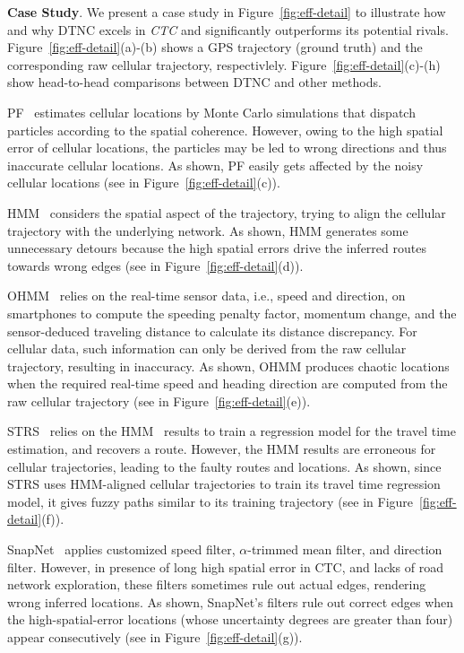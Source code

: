 \documentclass{vldb}
\begin{document}
	
	\textbf{Case Study}.
	We present a case study in Figure~\ref{fig:eff-detail} to illustrate how and why DTNC excels in \textit{CTC} and significantly outperforms its potential rivals.
	Figure~\ref{fig:eff-detail}(a)-(b) shows a GPS trajectory (ground truth) and the corresponding raw cellular trajectory, respectivlely. Figure~\ref{fig:eff-detail}(c)-(h) show head-to-head comparisons between DTNC and other methods. 
	
	PF~\cite{kempinska2016probabilistic} estimates cellular locations by Monte Carlo simulations that dispatch particles according to the spatial coherence. However, owing to the high spatial error of cellular locations, the particles may be led to wrong directions and thus inaccurate cellular locations. As shown,  PF easily gets affected by the noisy cellular locations (see in Figure~\ref{fig:eff-detail}(c)). 
	
	HMM~\cite{newson2009hidden} considers the spatial aspect of the trajectory, trying to align the cellular trajectory with the underlying network.
	As shown, HMM generates some unnecessary detours because the high spatial errors drive the inferred routes towards wrong edges (see in Figure~\ref{fig:eff-detail}(d)).
	
	OHMM~\cite{goh2012online} relies on the real-time sensor data, i.e., speed and direction, on smartphones to compute the speeding penalty factor, momentum change, and the sensor-deduced traveling distance to calculate its distance discrepancy. For cellular data, such information can only be derived from the raw cellular trajectory, resulting in inaccuracy. As shown, OHMM produces chaotic locations when the required real-time speed and heading direction are computed from the raw cellular trajectory (see in Figure~\ref{fig:eff-detail}(e)).
	
	STRS~\cite{DBLP:conf/kdd/WuMSZZCW16} relies on the HMM~\cite{newson2009hidden} results to train a regression model for the travel time estimation, and recovers a route. 
	However, the HMM results are erroneous for cellular trajectories, leading to the faulty routes and locations.
	As shown, since STRS uses HMM-aligned cellular trajectories to train its travel time regression model, it gives fuzzy paths similar to its training trajectory (see in Figure~\ref{fig:eff-detail}(f)).	
	
	SnapNet~\cite{mohamed2016accurate} applies customized speed filter, $\alpha$-trimmed mean filter, and direction filter.
	However, in presence of long high spatial error in CTC, and lacks of road network exploration, these filters sometimes rule out actual edges, rendering wrong inferred locations.
	As shown, SnapNet's filters rule out correct edges when the high-spatial-error locations (whose uncertainty degrees are greater than four) appear consecutively (see in Figure~\ref{fig:eff-detail}(g)). 
	
\end{document}
